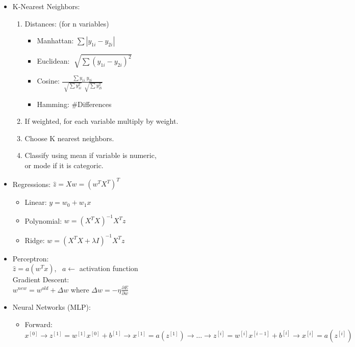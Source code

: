 \documentclass[twocolumn, 10pt]{article}
\begin{document}
\begin{itemize}[leftmargin=*, itemsep=0pt]
    \item K-Nearest Neighbors:
    \begin{enumerate}[topsep=0pt, itemsep=0pt]
        \item Distances: (for n variables)
        \begin{itemize}[topsep=0pt]
            \item Manhattan: $\displaystyle \sum |y_{1i}-y_{2i}|$
            \item Euclidean: $\displaystyle \sqrt[]{\sum (y_{1i}-y_{2i})^2}$
            \item Cosine: $\displaystyle \frac{\sum y_{1i}\ y_{2i}}
            {\sqrt[]{\sum y_{1i}^2}\ \sqrt[]{\sum y_{2i}^2}}$
            \item Hamming: \#Differences
        \end{itemize}
        \item If weighted, for each variable multiply by weight.
        \item Choose K nearest neighbors.
        \item Classify using mean if variable is numeric, \\
        or mode if it is categoric.
    \end{enumerate}

    \item Regressions: \; $\hat{z}=Xw=(w^TX^T)^T$
    \begin{itemize}[topsep=0pt, itemsep=0pt]
        \item Linear: $y=w_0+w_1x$
        \item Polynomial: $w=(X^TX)^{-1}X^Tz$
        \item Ridge: $w=(X^TX+\lambda I)^{-1}X^Tz$
    \end{itemize}

    \item Perceptron: \\
    $\hat{z}=a(w^Tx)$, \ $a  \leftarrow$ activation function \\[2pt]
    Gradient Descent: \\
    $w^{new}=w^{old}+\Delta w$ \; where \; 
    $\displaystyle \Delta w=-\eta\frac{\partial E}{\partial w}$

    \item Neural Networks (MLP):
    \begin{itemize}[topsep=0pt]
        \item Forward: $x^{[0]}\rightarrow z^{[1]}=w^{[1]}x^{[0]}+b^{[1]}\rightarrow x^{[1]}=a\left(z^{[1]}\right) \rightarrow \ldots \rightarrow z^{[i]}=w^{[i]}x^{[i-1]}+b^{[i]} \rightarrow x^{[i]}=a\left(z^{[i]}\right)$


\end{itemize}
\end{itemize}
\end{document}
